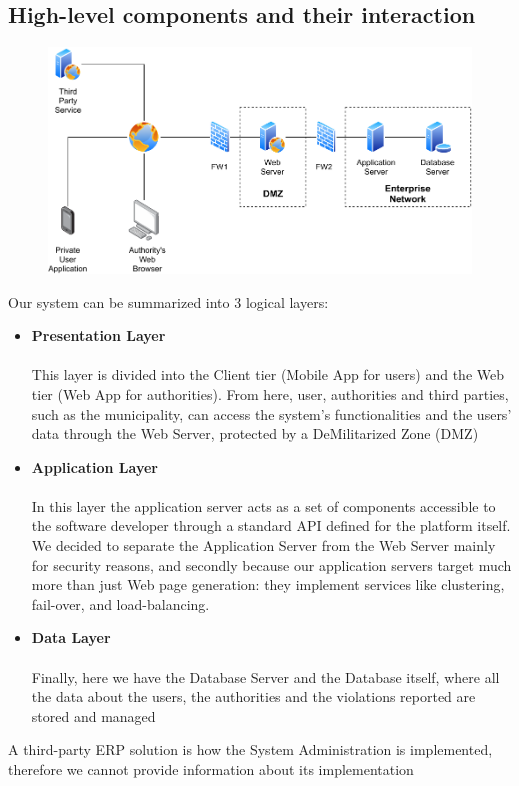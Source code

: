 \documentclass[12pt,a4paper]{article}
\begin{document}
\subsection{High-level components and their interaction}
\begin{figure}
		\centering
		\includegraphics[width=1.0\linewidth]{../assets/sequence_diagrams/exports/architecture.pdf}
	\end{figure}
Our system can be summarized into 3 logical layers:
\begin{itemize}
\item \textbf{Presentation Layer}\\\\
This layer is divided into the Client tier (Mobile App for users) and the Web tier (Web App for authorities). From here, user, authorities and third parties, such as the municipality, can access the system's functionalities and the users' data through the Web Server, protected by a DeMilitarized Zone (DMZ)
\item \textbf{Application Layer}\\\\
In this layer the application server acts as a set of components accessible to the software developer through a standard API defined for the platform itself. We decided to separate the Application Server from the Web Server mainly for security reasons, and secondly because our application servers target much more than just Web page generation: they implement services like clustering, fail-over, and load-balancing.
\item \textbf{Data Layer}\\\\
Finally, here we have the Database Server and the Database itself, where all the data about the users, the authorities and the violations reported are stored and managed\\
\end{itemize}
A third-party ERP solution is how the System Administration is implemented, therefore we cannot provide information about its implementation
\end{document}
